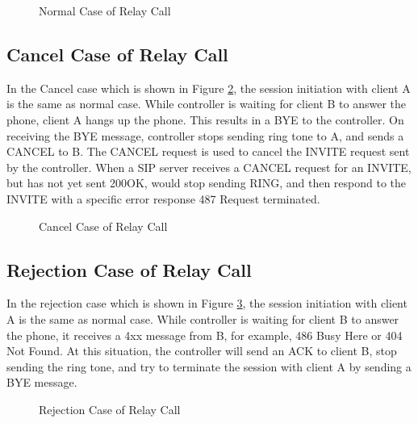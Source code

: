\begin{figure}[!hbtp]
\centering
{}
\caption{Normal Case of Relay Call}
\label{fig:NormalCaseOfRelayCall}
\end{figure}

\subsection{Cancel Case of Relay Call}
\label{sec:Solution:RelayCall:CancelCaseOfRelayCall}

In the Cancel case which is shown in Figure \ref{fig:CancelCaseOfRelayCall}, the session initiation with client A is the same as normal case. While controller is waiting for client B to answer the phone, client A hangs up the phone. This results in a BYE to the controller. On receiving the BYE message, controller stops sending ring tone to A, and sends a CANCEL to B. The CANCEL request is used to cancel the INVITE request sent by the controller. When a SIP server receives a CANCEL request for an INVITE, but has not yet sent 200OK, would stop sending RING, and then respond to the INVITE with a specific error response 487 Request terminated. 

\begin{figure}[!hbtp]
\centering
{}
\caption{Cancel Case of Relay Call}
\label{fig:CancelCaseOfRelayCall}
\end{figure}


\subsection{Rejection Case of Relay Call}
\label{sec:Solution:RelayCall:RejectionCaseOfRelayCall}

In the rejection case which is shown in Figure \ref{fig:RejectionCaseOfRelayCall}, the session initiation with client A is the same as normal case. While controller is waiting for client B to answer the phone, it receives a 4xx message from B, for example, 486 Busy Here or 404 Not Found. At this situation, the controller will send an ACK to client B, stop sending the ring tone, and try to terminate the session with client A by sending a BYE message.  

\begin{figure}[!hbtp]
\centering
{}
\caption{Rejection Case of Relay Call}
\label{fig:RejectionCaseOfRelayCall}
\end{figure}

